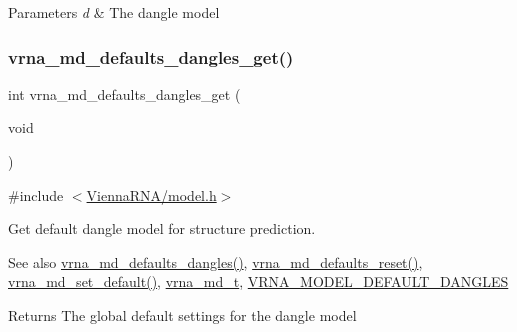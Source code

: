 \begin{DoxyParams}{Parameters}
{\em d} & The dangle model \\
\hline
\end{DoxyParams}
\mbox{\label{group__model__details_ga67ca06f95ae133778c79a4493c9817b8}} 
\subsubsection{\texorpdfstring{vrna\_md\_defaults\_dangles\_get()}{vrna\_md\_defaults\_dangles\_get()}}
{\footnotesize\ttfamily int vrna\+\_\+md\+\_\+defaults\+\_\+dangles\+\_\+get (\begin{DoxyParamCaption}\item[{void}]{ }\end{DoxyParamCaption})}



{\ttfamily \#include $<$\mbox{\hyperlink{model_8h}{Vienna\+R\+N\+A/model.\+h}}$>$}



Get default dangle model for structure prediction. 

\begin{DoxySeeAlso}{See also}
\mbox{\hyperlink{group__model__details_gac76a5374def8e5e4e644ff6e4cc72dee}{vrna\+\_\+md\+\_\+defaults\+\_\+dangles()}}, \mbox{\hyperlink{group__model__details_ga70834424cf804d149937de89f80ceb45}{vrna\+\_\+md\+\_\+defaults\+\_\+reset()}}, \mbox{\hyperlink{group__model__details_ga8ac6ff84936282436f822644bf841f66}{vrna\+\_\+md\+\_\+set\+\_\+default()}}, \mbox{\hyperlink{group__model__details_ga1f8a10e12a0a1915f2a4eff0b28ea17c}{vrna\+\_\+md\+\_\+t}}, \mbox{\hyperlink{group__model__details_ga2aa7bc2cae774b83a5c468f824c27a42}{V\+R\+N\+A\+\_\+\+M\+O\+D\+E\+L\+\_\+\+D\+E\+F\+A\+U\+L\+T\+\_\+\+D\+A\+N\+G\+L\+ES}} 
\end{DoxySeeAlso}
\begin{DoxyReturn}{Returns}
The global default settings for the dangle model 
\end{DoxyReturn}
\mbox{\label{group__model__details_gafff6449a02744add0308e653230c15fc}} 
